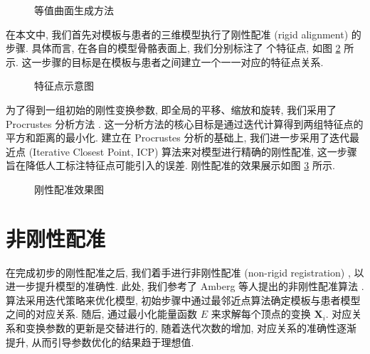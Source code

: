 \begin{figure}
  \centering
  \caption{等值曲面生成方法}
  \label{fig:isosurface}
\end{figure}

在本文中, 我们首先对模板与患者的三维模型执行了刚性配准 (rigid alignment) 的步骤.
具体而言, 在各自的模型骨骼表面上, 我们分别标注了  个特征点, 如图 \ref{fig:landmarks} 所示.
这一步骤的目标是在模板与患者之间建立一个一一对应的特征点关系.

\begin{figure}
  \centering
  \caption{特征点示意图}
  \label{fig:landmarks}
\end{figure}

为了得到一组初始的刚性变换参数, 即全局的平移、缩放和旋转, 我们采用了 Procrustes 分析方法 \cite{rossProcrustesAnalysis2004}.
这一分析方法的核心目标是通过迭代计算得到两组特征点的平方和距离的最小化.
建立在 Procrustes 分析的基础上, 我们进一步采用了迭代最近点 (Iterative Closest Point, ICP) 算法来对模型进行精确的刚性配准, 这一步骤旨在降低人工标注特征点可能引入的误差.
刚性配准的效果展示如图 \ref{fig:align} 所示.

\begin{figure}
  \centering
  \caption{刚性配准效果图}
  \label{fig:align}
\end{figure}

\section{非刚性配准}

在完成初步的刚性配准之后, 我们着手进行非刚性配准 (non-rigid registration) , 以进一步提升模型的准确性.
此处, 我们参考了 Amberg 等人提出的非刚性配准算法 \cite{ambergOptimalStepNonrigid2007}.
算法采用迭代策略来优化模型, 初始步骤中通过最邻近点算法确定模板与患者模型之间的对应关系.
随后, 通过最小化能量函数 $E$ 来求解每个顶点的变换 $\bm{X}_i$.
对应关系和变换参数的更新是交替进行的, 随着迭代次数的增加, 对应关系的准确性逐渐提升, 从而引导参数优化的结果趋于理想值.


